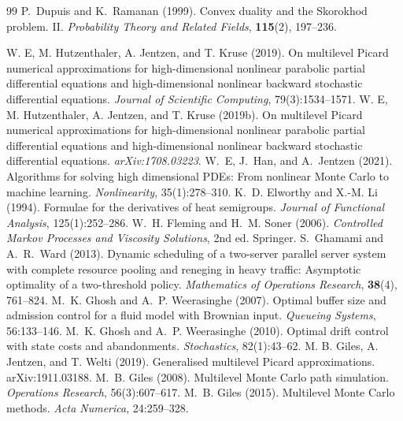 \documentclass[11pt]{article}
\theoremstyle{definition}
\theoremstyle{plain}
\begin{document}
\begin{singlespace}
\begin{thebibliography}{99}
P.~Dupuis and K.~Ramanan (1999).
Convex duality and the Skorokhod problem. II.
\emph{Probability Theory and Related Fields}, \textbf{115}(2), 197--236.

   W. E, M. Hutzenthaler, A. Jentzen, and T. Kruse (2019). \newblock On multilevel Picard numerical approximations for high-dimensional nonlinear parabolic partial differential equations and high-dimensional nonlinear backward stochastic differential equations. \newblock \emph{Journal of Scientific Computing}, 79(3):1534--1571.
   W. E, M. Hutzenthaler, A. Jentzen, and T. Kruse (2019b). \newblock On multilevel Picard numerical approximations for high-dimensional nonlinear parabolic partial differential equations and high-dimensional nonlinear backward stochastic differential equations. \newblock \emph{arXiv:1708.03223}.
   W.~E, J.~Han, and A.~Jentzen (2021). \newblock Algorithms for solving high dimensional PDEs: From nonlinear Monte Carlo to machine learning. \newblock \emph{Nonlinearity}, 35(1):278--310.
   K.~D. Elworthy and X.-M. Li (1994). \newblock Formulae for the derivatives of heat semigroups. \newblock \emph{Journal of Functional Analysis}, 125(1):252--286.
   W.~H. Fleming and H.~M. Soner (2006). \newblock \emph{Controlled Markov Processes and Viscosity Solutions}, 2nd ed. \newblock Springer.
S.~Ghamami and A.~R.~Ward (2013).
Dynamic scheduling of a two-server parallel server system with complete resource pooling and reneging in heavy traffic: Asymptotic optimality of a two-threshold policy.
\emph{Mathematics of Operations Research}, \textbf{38}(4), 761--824.
   M.~K. Ghosh and A.~P. Weerasinghe (2007). \newblock Optimal buffer size and admission control for a fluid model with Brownian input. \newblock \emph{Queueing Systems}, 56:133--146.
   M.~K. Ghosh and A.~P. Weerasinghe (2010). \newblock Optimal drift control with state costs and abandonments. \newblock \emph{Stochastics}, 82(1):43--62.
   M. B. Giles, A. Jentzen, and T. Welti (2019). \newblock Generalised multilevel Picard approximations. \newblock arXiv:1911.03188.
   M.~B. Giles (2008). \newblock Multilevel Monte Carlo path simulation. \newblock \emph{Operations Research}, 56(3):607--617.
   M.~B. Giles (2015). \newblock Multilevel Monte Carlo methods. \newblock \emph{Acta Numerica}, 24:259--328.

\end{thebibliography}
\end{singlespace}
\end{document}
